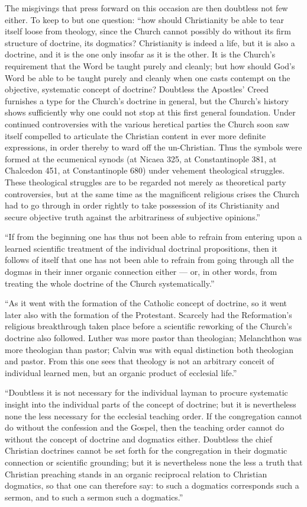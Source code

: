 \documentclass[12pt,a4paper]{book}
\begin{document}
The misgivings that press forward on this occasion are then doubtless not few either. To keep
to but one question: ``how should Christianity be able to tear itself loose from theology,
since the Church cannot possibly do without its firm structure of doctrine, its dogmatics?
Christianity is indeed a life, but it is also a doctrine, and it is the one only insofar as it
is the other. It is the Church's requirement that the Word be taught purely and cleanly; but
how should God's Word be able to be taught purely and cleanly when one casts contempt on the
objective, systematic concept of doctrine? Doubtless the Apostles' Creed furnishes a
type for the Church's doctrine in general, but the Church's history shows sufficiently why one
could not stop at this first general foundation. Under continued controversies with the various
heretical parties the Church soon saw itself compelled to articulate the Christian content in
ever more definite expressions, in order thereby to ward off the un-Christian. Thus the symbols
were formed at the ecumenical synods (at Nicaea 325, at Constantinople 381, at Chalcedon 451,
at Constantinople 680) under vehement theological struggles. These theological struggles are to
be regarded not merely as theoretical party controversies, but at the same time as the
magnificent religious crises the Church had to go through in order rightly to take possession of
its Christianity and secure objective truth against the arbitrariness of subjective opinions.''

``If from the beginning one has thus not been able to refrain from entering upon a learned
scientific treatment of the individual doctrinal propositions, then it follows of itself that one
has not been able to refrain from going through all the dogmas in their inner organic connection
either --- or, in other words, from treating the whole doctrine of the Church systematically.''

``As it went with the formation of the Catholic concept of doctrine, so it went later also with
the formation of the Protestant. Scarcely had the Reformation's religious breakthrough taken
place before a scientific reworking of the Church's doctrine also followed. Luther was more
pastor than theologian; Melanchthon was more theologian than pastor; Calvin was with equal
distinction both theologian and pastor. From this one sees that theology is not an arbitrary
conceit of individual learned men, but an organic product of ecclesial life.''

``Doubtless it is not necessary for the individual layman to procure systematic insight into the
individual parts of the concept of doctrine; but it is nevertheless none the less necessary for
the ecclesial teaching order. If the congregation cannot do without the confession and the
Gospel, then
the teaching order cannot do without the concept of doctrine and dogmatics either. Doubtless the
chief Christian doctrines cannot be set forth for the congregation in their dogmatic connection
or scientific grounding; but it is nevertheless none the less a truth that Christian preaching
stands in an organic reciprocal relation to Christian dogmatics, so that one can therefore say:
to such a dogmatics corresponds such a sermon, and to such a sermon such a dogmatics.''
\end{document}
